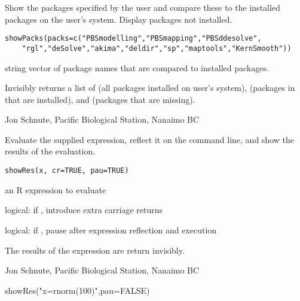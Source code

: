 \documentclass[letterpaper]{book}
\begin{document}
\begin{Description}\relax
Show the packages specified by the user and compare these to the 
installed packages on the user's system. Display packages not installed.
\end{Description}
\begin{Usage}
\begin{verbatim}
showPacks(packs=c("PBSmodelling","PBSmapping","PBSddesolve",
    "rgl","deSolve","akima","deldir","sp","maptools","KernSmooth"))
\end{verbatim}
\end{Usage}
\begin{Arguments}
\begin{ldescription}
\item[\code{packs}] string vector of package names that are compared to installed packages. 
\end{ldescription}
\end{Arguments}
\begin{Value}
Invisibly returns a list of  (all packages installed on user's system),
 (packages in  that are installed), and
 (packages that are missing).
\end{Value}
\begin{Author}\relax
Jon Schnute, Pacific Biological Station, Nanaimo BC
\end{Author}

\begin{Description}\relax
Evaluate the supplied expression, reflect it on the command line, 
and show the results of the evaluation.
\end{Description}
\begin{Usage}
\begin{verbatim}
showRes(x, cr=TRUE, pau=TRUE)
\end{verbatim}
\end{Usage}
\begin{Arguments}
\begin{ldescription}
\item[\code{x}] an R expression to evaluate
\item[\code{cr}] logical: if , introduce extra carriage returns
\item[\code{pau}] logical: if , pause after expression reflection and execution
\end{ldescription}
\end{Arguments}
\begin{Value}
The results of the expression are return invisibly.
\end{Value}
\begin{Author}\relax
Jon Schnute, Pacific Biological Station, Nanaimo BC
\end{Author}
\begin{Examples}
\begin{ExampleCode}
showRes("x=rnorm(100)",pau=FALSE)
\end{ExampleCode}
\end{Examples}
\end{document}
